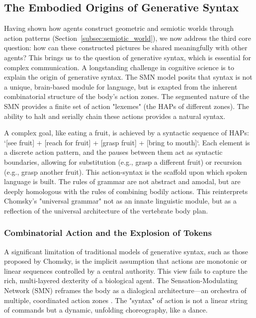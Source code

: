 \subsection{The Embodied Origins of Generative Syntax}
\label{subsec:syntax}
Having shown how agents construct geometric and semiotic worlds through action patterns (Section~\ref{subsec:semiotic_world}), we now address the third core question: how can these constructed pictures be shared meaningfully with other agents? This brings us to the question of generative syntax, which is essential for complex communication. A longstanding challenge in cognitive science is to explain the origin of generative syntax. The SMN model posits that syntax is not a unique, brain-based module for language, but is exapted from the inherent combinatorial structure of the body's action zones. The segmented nature of the SMN provides a finite set of action "lexemes" (the HAPs of different zones). The ability to halt and serially chain these actions provides a natural syntax. 

A complex goal, like eating a fruit, is achieved by a syntactic sequence of HAPs: `[see fruit] + [reach for fruit] + [grasp fruit] + [bring to mouth]`. Each element is a discrete action pattern, and the pauses between them act as syntactic boundaries, allowing for substitution (e.g., grasp a different fruit) or recursion (e.g., grasp another fruit). This action-syntax is the scaffold upon which spoken language is built. The rules of grammar are not abstract and amodal, but are deeply homologous with the rules of combining bodily actions. This reinterprets Chomsky's "universal grammar" not as an innate linguistic module, but as a reflection of the universal architecture of the vertebrate body plan.

\subsubsection{Combinatorial Action and the Explosion of Tokens}
\label{ssubsec:combinatorial}
A significant limitation of traditional models of generative syntax, such as those proposed by Chomsky, is the implicit assumption that actions are monotonic or linear sequences controlled by a central authority. This view fails to capture the rich, multi-layered dexterity of a biological agent. The Sensation-Modulating Network (SMN) reframes the body as a dialogical architecture—an orchestra of multiple, coordinated action zones \cite{bernstein2014dexterity}. The "syntax" of action is not a linear string of commands but a dynamic, unfolding choreography, like a dance.

